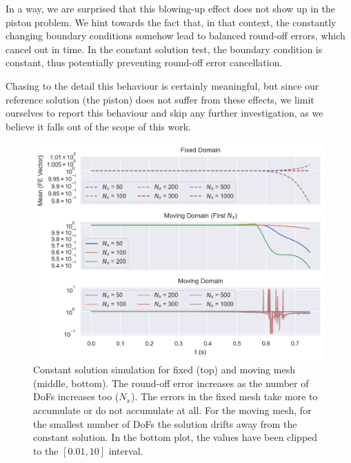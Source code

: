 \documentclass[../../thesis.tex]{subfiles}
\begin{document}
In a way, we are surprised that this blowing-up effect does not show up in the piston problem.
We hint towards the fact that, in that context, the constantly changing boundary conditions
somehow lead to balanced round-off errors, which cancel out in time.
In the constant solution test, the boundary condition is constant,
thus potentially preventing round-off error cancellation.

Chasing to the detail this behaviour is certainly meaningful, 
but since our reference solution (the piston) does not suffer from these effects,
we limit ourselves to report this behaviour and skip any further investigation, 
as we believe it falls out of the scope of this work. 

\begin{figure}[h]
    \centering
    \includegraphics[width=1\columnwidth]{research_project/piston/figures/ale_effect/mean_fe_comparison_constant_solution.png}
    \caption{Constant solution simulation for fixed (top) and moving mesh (middle, bottom).
    The round-off error increases as the number of DoFs increases too ($N_x$). 
    The errors in the fixed mesh take more to accumulate or do not accumulate at all.
    For the moving mesh, for the smallest number of DoFs the solution drifts away from the constant solution.
    In the bottom plot, the values have been clipped to the $[0.01, 10]$ interval.}
    \label{fig:ale_effect_constant_solution}
\end{figure}
\end{document}

